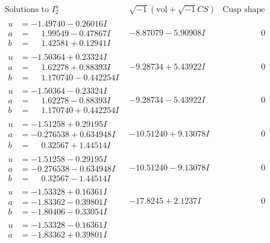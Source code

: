 \documentclass[1p]{elsarticle_modified}
\theoremstyle{definition}
\newcommand{\I}{\sqrt{-1}}
\begin{document}
$$\begin{array}{c|c|c}
\text{Solutions to }I^u_{2}& \I (\text{vol} + \sqrt{-1}CS) & \text{Cusp shape}\\
 \hline 
\begin{aligned}
u &= -1.49740 - 0.26016 I \\
a &= \phantom{-}1.99549 - 0.47867 I \\
b &= \phantom{-}1.42581 + 0.12941 I\end{aligned}
 & -8.87079 - 5.90908 I & \phantom{-0.000000 } 0 \\ \hline\begin{aligned}
u &= -1.50364 + 0.23324 I \\
a &= \phantom{-}1.62278 + 0.88393 I \\
b &= \phantom{-}1.170740 - 0.442254 I\end{aligned}
 & -9.28734 + 5.43922 I & \phantom{-0.000000 } 0 \\ \hline\begin{aligned}
u &= -1.50364 - 0.23324 I \\
a &= \phantom{-}1.62278 - 0.88393 I \\
b &= \phantom{-}1.170740 + 0.442254 I\end{aligned}
 & -9.28734 - 5.43922 I & \phantom{-0.000000 } 0 \\ \hline\begin{aligned}
u &= -1.51258 + 0.29195 I \\
a &= -0.276538 + 0.634948 I \\
b &= \phantom{-}0.32567 + 1.44514 I\end{aligned}
 & -10.51240 + 9.13078 I & \phantom{-0.000000 } 0 \\ \hline\begin{aligned}
u &= -1.51258 - 0.29195 I \\
a &= -0.276538 - 0.634948 I \\
b &= \phantom{-}0.32567 - 1.44514 I\end{aligned}
 & -10.51240 - 9.13078 I & \phantom{-0.000000 } 0 \\ \hline\begin{aligned}
u &= -1.53328 + 0.16361 I \\
a &= -1.83362 - 0.39801 I \\
b &= -1.80406 - 0.33054 I\end{aligned}
 & -17.8245 + 2.1237 I & \phantom{-0.000000 } 0 \\ \hline\begin{aligned}
u &= -1.53328 - 0.16361 I \\
a &= -1.83362 + 0.39801 I \\

\end{aligned}
\end{array}$$
\end{document}

